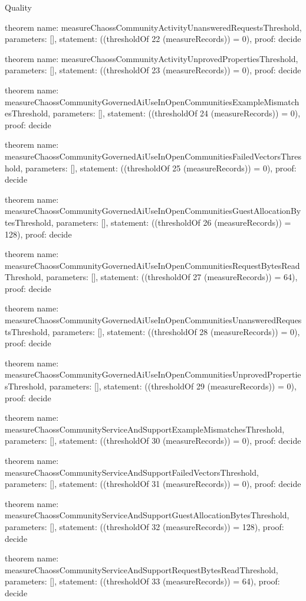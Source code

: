 \begin{lexlean}{Quality}
\begin{semanticmodule}
theorem{
  name: measureChaossCommunityActivityUnansweredRequestsThreshold,
  parameters: [],
  statement: ((thresholdOf 22 (measureRecords)) = 0),
  proof: decide{}
}

theorem{
  name: measureChaossCommunityActivityUnprovedPropertiesThreshold,
  parameters: [],
  statement: ((thresholdOf 23 (measureRecords)) = 0),
  proof: decide{}
}

theorem{
  name: measureChaossCommunityGovernedAiUseInOpenCommunitiesExampleMismatchesThreshold,
  parameters: [],
  statement: ((thresholdOf 24 (measureRecords)) = 0),
  proof: decide{}
}

theorem{
  name: measureChaossCommunityGovernedAiUseInOpenCommunitiesFailedVectorsThreshold,
  parameters: [],
  statement: ((thresholdOf 25 (measureRecords)) = 0),
  proof: decide{}
}

theorem{
  name: measureChaossCommunityGovernedAiUseInOpenCommunitiesGuestAllocationBytesThreshold,
  parameters: [],
  statement: ((thresholdOf 26 (measureRecords)) = 128),
  proof: decide{}
}

theorem{
  name: measureChaossCommunityGovernedAiUseInOpenCommunitiesRequestBytesReadThreshold,
  parameters: [],
  statement: ((thresholdOf 27 (measureRecords)) = 64),
  proof: decide{}
}

theorem{
  name: measureChaossCommunityGovernedAiUseInOpenCommunitiesUnansweredRequestsThreshold,
  parameters: [],
  statement: ((thresholdOf 28 (measureRecords)) = 0),
  proof: decide{}
}

theorem{
  name: measureChaossCommunityGovernedAiUseInOpenCommunitiesUnprovedPropertiesThreshold,
  parameters: [],
  statement: ((thresholdOf 29 (measureRecords)) = 0),
  proof: decide{}
}

theorem{
  name: measureChaossCommunityServiceAndSupportExampleMismatchesThreshold,
  parameters: [],
  statement: ((thresholdOf 30 (measureRecords)) = 0),
  proof: decide{}
}

theorem{
  name: measureChaossCommunityServiceAndSupportFailedVectorsThreshold,
  parameters: [],
  statement: ((thresholdOf 31 (measureRecords)) = 0),
  proof: decide{}
}

theorem{
  name: measureChaossCommunityServiceAndSupportGuestAllocationBytesThreshold,
  parameters: [],
  statement: ((thresholdOf 32 (measureRecords)) = 128),
  proof: decide{}
}

theorem{
  name: measureChaossCommunityServiceAndSupportRequestBytesReadThreshold,
  parameters: [],
  statement: ((thresholdOf 33 (measureRecords)) = 64),
  proof: decide{}
}


\end{semanticmodule}
\end{lexlean}
